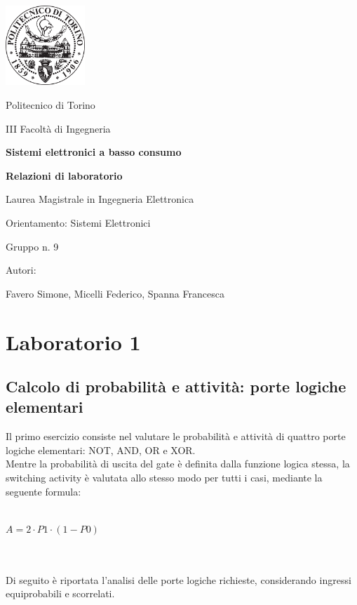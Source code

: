 \documentclass[10pt,  english, makeidx, a4paper, titlepage, oneside]{book}
\begin{document}
\begin{titlepage}

	\centerline{\includegraphics[width=3cm]{./img/general/polito.png}}
	\vspace{0.3cm}
	\centerline{\Large{Politecnico di Torino}}
	\vspace{0.3cm}
	\centerline{\Large{III Facoltà di Ingegneria}}
	\vspace{3cm}
	\centerline{\Huge\textbf{Sistemi elettronici a basso consumo}}
	\vspace{1cm}
	\centerline{\LARGE\textbf{Relazioni di laboratorio}}
	\vspace{3cm}
	\centerline{\LARGE{Laurea Magistrale in Ingegneria Elettronica}}
	\vspace{0.3cm}
	\centerline{\LARGE{Orientamento: Sistemi Elettronici}}
	\vspace{3cm}
	\centerline{\Large{Gruppo n. 9}}
	\vspace{2cm}
	\centerline{\Large{Autori:}}
	\vspace{0.3cm}
	\centerline{\Large{Favero Simone, Micelli Federico, Spanna Francesca}}
	
\end{titlepage}

\tableofcontents %
\pagebreak %

\chapter{Laboratorio 1}


\section{Calcolo di probabilità e attività: porte logiche elementari}

Il primo esercizio consiste nel valutare le probabilità e attività di 
quattro porte logiche elementari: NOT, AND, OR e XOR.
\\
Mentre la probabilità di uscita del gate è definita dalla funzione logica
stessa, la switching activity è valutata allo stesso modo per tutti i casi, 
mediante la seguente formula:
\\\\
	\centerline{$A = 2 \cdot P1 \cdot (1-P0)$}
\\\\
Di seguito è riportata l'analisi delle porte logiche richieste, considerando 
ingressi equiprobabili e scorrelati.
\end{document}
